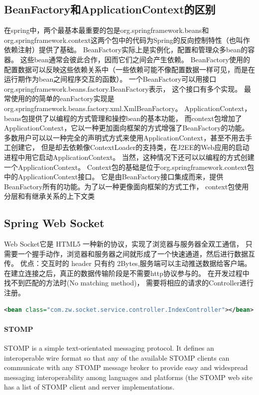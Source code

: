\documentclass{book}
\begin{document}
\subsection{BeanFactory和ApplicationContext的区别}

在spring中，两个最基本最重要的包是org.springframework.beans和
org.springframework.context这两个包中的代码为Spring的反向控制特性（也叫作依赖注射）提供了基础。
BeanFactory实际上是实例化，配置和管理众多bean的容器。 
这些bean通常会彼此合作，因而它们之间会产生依赖。
BeanFactory使用的配置数据可以反映这些依赖关系中（一些依赖可能不像配置数据一样可见，而是在运行期作为bean之间程序交互的函数）。
一个BeanFactory可以用接口org.springframework.beans.factory.BeanFactory表示， 这个接口有多个实现。 最常使用的的简单的eanFactory实现是org.springframework.beans.factory.xml.XmlBeanFactory。
ApplicationContext，beans包提供了以编程的方式管理和操控bean的基本功能，
而context包增加了ApplicationContext，它以一种更加面向框架的方式增强了BeanFactory的功能。
多数用户可以以一种完全的声明式方式来使用ApplicationContext，甚至不用去手工创建它，
但是却去依赖像ContextLoader的支持类，在J2EE的Web应用的启动进程中用它启动ApplicationContext。
当然，这种情况下还可以以编程的方式创建一个ApplicationContext。
Context包的基础是位于org.springframework.context包中的ApplicationContext接口。
它是由BeanFactory接口集成而来，提供BeanFactory所有的功能。为了以一种更像面向框架的方式工作，
context包使用分层和有继承关系的上下文类

\subsection{Spring Web Socket}

Web Socket它是 HTML5 一种新的协议，实现了浏览器与服务器全双工通信，
只需要一个握手动作，浏览器和服务器之间就形成了一个快速通道，然后进行数据互传。
优点：交互时的 header 只有约 2Bytes,服务端可以主动推送数据给客户端。
在建立连接之后，真正的数据传输阶段是不需要http协议参与的。
在开发过程中找不到匹配的方法时(No matching method)，
需要将相应的请求的Controller进行注册。

\begin{lstlisting}[language=XML]
<bean class="com.zw.socket.service.controller.IndexController"></bean>
\end{lstlisting}

\paragraph{STOMP}

STOMP is a simple text-orientated messaging protocol. 
It defines an interoperable wire format so that any of 
the available STOMP clients can communicate with any STOMP 
message broker to provide easy and widespread messaging 
interoperability among languages and platforms 
(the STOMP web site has a list of STOMP client and server implementations.
\end{document}
